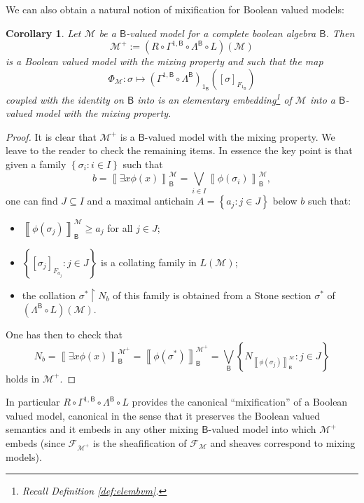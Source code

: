 \documentclass[11pt]{amsart}
\newcommand{\F}{\mathcal{F}}
\theoremstyle{plain}
\newtheorem{corollary}[theorem]{Corollary}
\theoremstyle{definition}
\theoremstyle{plain}
\theoremstyle{remark}
\newcommand{\M}{\mathcal{M}}
\newcommand{\bool}[1]{\mathsf{#1}}
\newcommand{\Qp}[1]{\left\llbracket #1 \right\rrbracket}
\newcommand{\bp}[1]{\left\lbrace #1 \right\rbrace}
\newcommand{\0}{\mathsf{0}}
\renewcommand{\1}{\mathsf{1}}
\renewcommand{\2}{\mathsf{2}}
\theoremstyle{definition}
\begin{document}
We can also obtain a natural notion of mixification for Boolean valued models:
\begin{corollary}\label{cor:mixbvm}
Let $\M$ be a $\bool{B}$-valued model for a complete boolean algebra $\bool{B}$. Then
\[\M^+:=(R\circ\Gamma^{1,\bool{B}}\circ\Lambda^{\bool{B}}\circ L)(\M)\] is a Boolean valued model with the mixing property and such that the map \[\Phi_\M:\sigma\mapsto (\Gamma^{1,\bool{B}}\circ \Lambda^{\bool{B}})_{1_{\bool{B}}}([\sigma]_{F_{1_\bool{B}}})\] coupled with the identity on $\bool{B}$ into 
 is an elementary embedding\footnote{Recall Definition \ref{def:elembvm}.} of $\M$ into a $\bool{B}$-valued model with the mixing property.
\end{corollary}
\begin{proof}
It is clear that $\M^+$ is a $\bool{B}$-valued model with the mixing property. We leave to the reader to check the remaining items. In essence the key point is that given a  family $\bp{\sigma_i:i\in I}$ such that 
\[
b=\Qp{\exists x \phi(x)}^{\M}_{\bool{B}}=\bigvee_{i\in I}\Qp{\phi(\sigma_i)}^{\M}_{\bool{B}},
\] 
one can find $J\subseteq I$ and a maximal antichain $A=\bp{a_j:j\in J}$ below $b$ such that:
\begin{itemize} 
\item
$\Qp{\phi(\sigma_j)}^{\M}_{\bool{B}}\geq a_j$ for all $j\in J$;
\item
$\bp{[\sigma_j]_{F_{a_j}}:j\in J}$ is a collating family in
$L(\M)$;
\item the collation $\sigma^*\restriction N_b$ of this family is obtained from a Stone section $\sigma^*$ of  
$(\Lambda^{\bool{B}}\circ L)(\M)$.
\end{itemize}
One has then to check that 
\[
N_b=\Qp{\exists x\phi(x)}^{\M^+}_{\bool{B}}=\Qp{\phi(\sigma^*)}^{\M^+}_{\bool{B}}=\bigvee_{\bool{B}} 
\bp{N_{\Qp{\phi(\sigma_j)}^{\M}_{\bool{B}}}:j\in J}
\]
 holds in $\M^+$.
\end{proof}
In particular $R\circ\Gamma^{1,\bool{B}}\circ\Lambda^{\bool{B}}\circ L$ provides the canonical ``mixification'' of a Boolean valued model, canonical in the sense that it preserves the Boolean valued semantics and it embeds  in any other mixing $\bool{B}$-valued model into which  $\M^+$ embeds (since $\F_{\M^+}$ is the sheafification of $\F_\M$ and sheaves correspond to mixing models).
\end{document}
